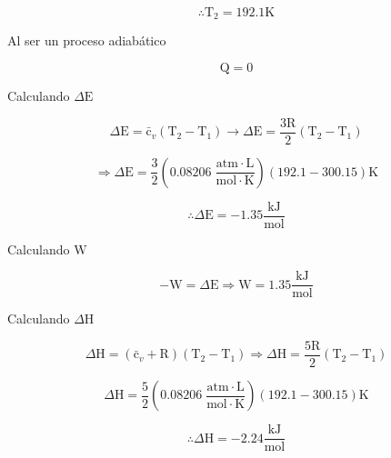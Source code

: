 \documentclass[12pt]{article}
\begin{document}
\begin{displaymath}
	\therefore \mathrm{T}_2=192.1\mathrm{K}
\end{displaymath}

Al ser un proceso adiabático 

\begin{displaymath}
	\mathrm{Q}=0
\end{displaymath}

Calculando $\Delta\mathrm{E}$

\begin{displaymath}
	\Delta \mathrm{E}=\mathrm{\bar{c}}_v(\mathrm{T}_2-\mathrm{T}_1)\rightarrow \Delta\mathrm{E}=\frac{3\mathrm{R}}{2}\left( \mathrm{T}_2-\mathrm{T}_1 \right)
\end{displaymath}

\begin{displaymath}
	\Rightarrow \Delta\mathrm{E}=\frac{3}{2}\left( 0.08206\; \frac{\mathrm{atm}\cdot\mathrm{L}}{\mathrm{mol}\cdot\mathrm{K}} \right) \left( 192.1-300.15 \right)\mathrm{K}
\end{displaymath}

\begin{displaymath}
	\therefore \Delta\mathrm{E}=-1.35\frac{\mathrm{kJ}}{\mathrm{mol}}
\end{displaymath}

Calculando $\mathrm{W}$

\begin{displaymath}
	-\mathrm{W}=\Delta\mathrm{E}\Rightarrow \mathrm{W}=1.35\frac{\mathrm{kJ}}{\mathrm{mol}}
\end{displaymath}

Calculando $\Delta\mathrm{H}$

\begin{displaymath}
	\Delta\mathrm{H}=(\mathrm{\bar{c}}_v+\mathrm{R})(\mathrm{T}_2-\mathrm{T}_1)\Rightarrow \Delta\mathrm{H}=\frac{5\mathrm{R}}{2}(\mathrm{T}_2-\mathrm{T}_1)
\end{displaymath}

\begin{displaymath}
	\Delta\mathrm{H}=\frac{5}{2}\left( 0.08206\; \frac{\mathrm{atm}\cdot\mathrm{L}}{\mathrm{mol}\cdot\mathrm{K}} \right)\left( 192.1-300.15 \right)\mathrm{K}
\end{displaymath}

\begin{displaymath}
	\therefore \Delta\mathrm{H}=-2.24 \frac{\mathrm{kJ}}{\mathrm{mol}}
\end{displaymath}
\end{document}
